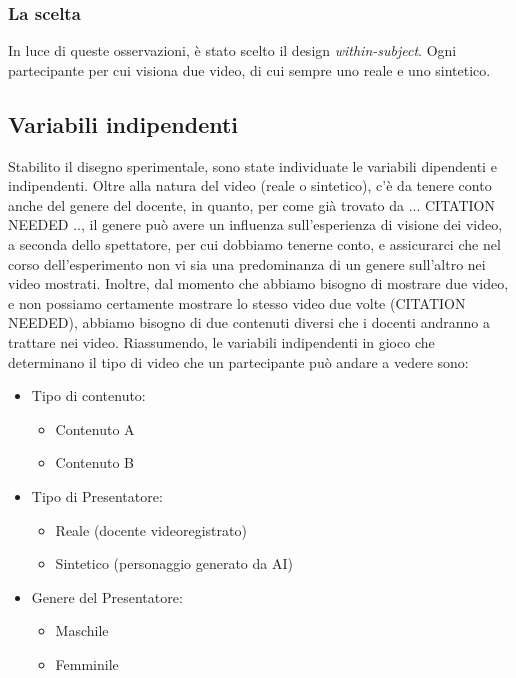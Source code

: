 \subsubsection{La scelta}

In luce di queste osservazioni, è stato scelto il design \textit{within-subject}. Ogni partecipante per cui visiona due video, di cui sempre uno reale e uno sintetico.

\subsection{Variabili indipendenti}
\label{sec:variabili_indipendenti}

Stabilito il disegno sperimentale, sono state individuate le variabili dipendenti e indipendenti. Oltre alla natura del video (reale o sintetico), c'è da tenere conto anche del genere del docente, in quanto, per come già trovato da ... CITATION NEEDED .., il genere può avere un influenza sull'esperienza di visione dei video, a seconda dello spettatore, per cui dobbiamo tenerne conto, e assicurarci che nel corso dell'esperimento non vi sia una predominanza di un genere sull'altro nei video mostrati. Inoltre, dal momento che abbiamo bisogno di mostrare due video, e non possiamo certamente mostrare lo stesso video due volte (CITATION NEEDED), abbiamo bisogno di due contenuti diversi che i docenti andranno a trattare nei video. Riassumendo, le variabili indipendenti in gioco che determinano il tipo di video che un partecipante può andare a vedere sono:
\begin{itemize}
    \item Tipo di contenuto:
    \begin{itemize}
        \item Contenuto A
        \item Contenuto B
    \end{itemize} 
    \item Tipo di Presentatore:
    \begin{itemize}
        \item Reale (docente videoregistrato)
        \item Sintetico (personaggio generato da AI)
    \end{itemize}
    \item Genere del Presentatore:
    \begin{itemize}
        \item Maschile
        \item Femminile
    \end{itemize}
\end{itemize}

